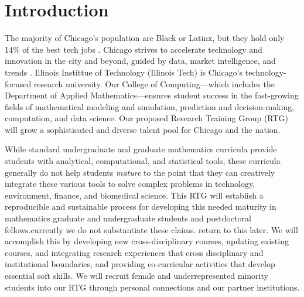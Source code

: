 \documentclass[11pt]{NSFamsart}
\begin{document}
\section{Introduction}

The majority of Chicago's population are Black or Latinx, but they hold only 14\% of the best tech jobs \cite{P33}. 
Chicago strives to accelerate  technology and innovation in the city and beyond, guided by data, market intelligence, and trends \cite{Chicago}. Illinois Instittue of Technology (Illinois Tech) is Chicago's technology-focused research university.  Our College of Computing---which includes the Department of Applied Mathematics---ensures student success in the fast-growing fields of mathematical modeling and simulation, prediction and decision-making, computation, and data science. Our proposed Research Training Group (RTG) will grow a sophisticated and diverse talent pool for Chicago and the nation.

While standard undergraduate and graduate mathematics curricula provide students with  analytical, computational, and statistical tools, these curricula generally do not help students \emph{mature} to the point that they can creatively integrate these various  tools to solve complex problems in technology, environment, finance, and biomedical science. This RTG will establish a reproducible and sustainable process for developing this needed maturity in mathematics graduate and undergraduate students and postdoctoral fellows.{\color{magenta}currently we do not substantiate these claims. return to this later.} We will accomplish this by developing new cross-disciplinary courses, updating existing courses, and integrating research experiences that cross disciplinary and institutional boundaries, and providing co-curricular activities that develop essential soft skills.  We will recruit female and underrepresented minority students into our RTG through personal connections and our partner institutions.
\end{document}
